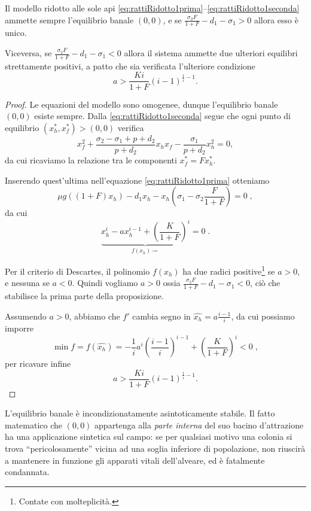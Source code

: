 \begin{proposizione}
    Il modello ridotto alle sole api \eqref{eq:rattiRidotto1prima}--\eqref{eq:rattiRidotto1seconda} ammette sempre l'equilibrio banale $(0,0)$, e se $\frac{\sigma_2 F}{1+F} - d_1 - \sigma_1 >0$ allora esso è unico.

    Viceversa, se $\frac{\sigma_2 F}{1+F} - d_1 - \sigma_1 <0$ allora il sistema ammette due ulteriori equilibri strettamente positivi, a patto che sia verificata l'ulteriore condizione
    $$a > \frac{Ki}{1+F} (i-1)^{\frac{1}{i} -1}.$$
    \label{prop:rExist}
\end{proposizione}

\begin{proof}
    Le equazioni del modello sono omogenee, dunque l'equilibrio banale $(0,0)$ esiste sempre.
    Dalla \eqref{eq:rattiRidotto1seconda} segue che ogni punto di equilibrio
    $(x_h^*, x_f^*) > (0,0)$ verifica
    $$x_f^2 + \frac{\sigma_2 - \sigma_1 + p + d_2}{p +d_2} x_h x_f - \frac{\sigma_1}{p+d_2} x_h^2 = 0,$$
    da cui ricaviamo la relazione tra le componenti $x_f^* = F x_h^*$.

    Inserendo quest'ultima nell'equazione \eqref{eq:rattiRidotto1prima} otteniamo
    $$ \mu g \left( (1+F) x_h \right) -d_1 x_h -x_h \left( \sigma_1 - \sigma_2 \frac{F}{1+F} \right) = 0 \; ,$$
    da cui
    $$ \underbrace{ x_h^i -a x_h^{i-1} + \left( { \frac{K}{1+F} } \right)^i }_{ f(x_h) \coloneq } = 0 \; .$$

    Per il criterio di Descartes, il polinomio $f(x_h)$ ha due radici positive\footnote{Contate con molteplicità.}
    se $a>0$, e nessuna se $a<0$. Quindi vogliamo $a>0$ ossia $\frac{\sigma_2 F}{1+F} -d_1 - \sigma_1 < 0$, ciò che
    stabilisce la prima parte della proposizione.

    Assumendo $a>0$, abbiamo che $f'$ cambia segno in $\hat{ x_h } = a \frac{i-1}{i}$, da cui
    possiamo imporre
    $$\min f = f( \hat{ x_h } ) =
    - \frac{1}{i} a^i { \left( \frac{i-1}{i} \right) }^{i-1} + {\left( \frac{K}{1+F} \right) }^i < 0
    \; ,$$
    per ricavare infine
    $$a > \frac{Ki}{1+F} {(i-1)}^{ \frac{1}{i} - 1 }.$$
\end{proof}

L'equilibrio banale è incondizionatamente asintoticamente stabile.
Il fatto matematico che $(0,0)$ appartenga alla \emph{parte interna} del suo bacino d'attrazione
ha una applicazione sintetica sul campo: se per qualsiasi motivo una colonia si trova ``pericolosamente''
vicina ad una soglia inferiore di popolazione, non riuscirà a mantenere in funzione gli apparati vitali
dell'alveare, ed è fatalmente condannata.

